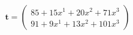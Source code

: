 \documentclass[preview]{standalone}
\begin{document}
\begin{align*}
\mathbf{t} = \begin{pmatrix}85 + 15x^{1} + 20x^{2} + 71x^{3} \\ 91 + 9x^{1} + 13x^{2} + 101x^{3}\end{pmatrix}
\end{align*}
\end{document}
